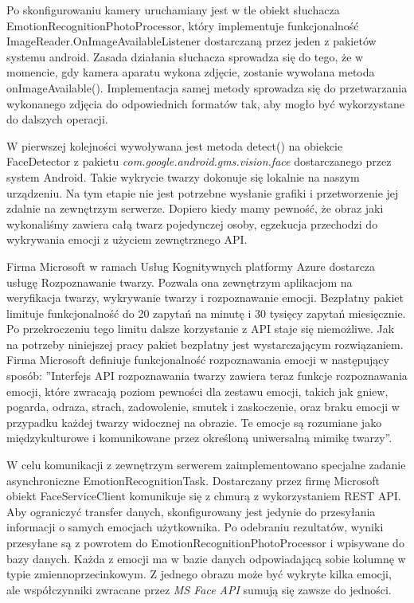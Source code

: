 Po skonfigurowaniu kamery uruchamiany jest w tle obiekt słuchacza EmotionRecognitionPhotoProcessor, który implementuje funkcjonalność ImageReader.OnImageAvailableListener dostarczaną przez jeden z pakietów systemu android. Zasada działania słuchacza sprowadza się do tego, że w momencie, gdy kamera aparatu wykona zdjęcie, zostanie wywołana metoda onImageAvailable(). Implementacja samej metody sprowadza się do przetwarzania wykonanego zdjęcia do odpowiednich formatów tak, aby mogło być wykorzystane do dalszych operacji.

W pierwszej kolejności wywoływana jest metoda detect() na obiekcie FaceDetector z pakietu \textit{com.google.android.gms.vision.face} dostarczanego przez system Android. Takie wykrycie twarzy dokonuje się lokalnie na naszym urządzeniu. Na tym etapie nie jest potrzebne wysłanie grafiki i przetworzenie jej zdalnie na zewnętrzym serwerze. Dopiero kiedy mamy pewność, że obraz jaki wykonaliśmy zawiera całą twarz pojedynczej osoby, egzekucja przechodzi do wykrywania emocji z użyciem zewnętrznego API.

Firma Microsoft w ramach Usług Kognitywnych platformy Azure dostarcza usługę Rozpoznawanie twarzy. Pozwala ona zewnętrzym aplikacjom na weryfikacja twarzy, wykrywanie twarzy i rozpoznawanie emocji. Bezpłatny pakiet limituje funkcjonalność do 20 zapytań na minutę i 30 tysięcy zapytań miesięcznie. Po przekroczeniu tego limitu dalsze korzystanie z API staje się niemożliwe. Jak na potrzeby niniejszej pracy pakiet bezpłatny jest wystarczającym rozwiązaniem. Firma Microsoft definiuje funkcjonalność rozpoznawania emocji w następujący sposób: ''Interfejs API rozpoznawania twarzy zawiera teraz funkcje rozpoznawania emocji, które zwracają poziom pewności dla zestawu emocji, takich jak gniew, pogarda, odraza, strach, zadowolenie, smutek i zaskoczenie, oraz braku emocji w przypadku każdej twarzy widocznej na obrazie. Te emocje są rozumiane jako międzykulturowe i komunikowane przez określoną uniwersalną mimikę twarzy''\cite{azure}.

W celu komunikacji z zewnętrzym serwerem zaimplementowano specjalne zadanie asynchroniczne EmotionRecognitionTask. Dostarczany przez firmę Microsoft obiekt FaceServiceClient komunikuje się z chmurą z wykorzystaniem REST API. Aby ograniczyć transfer danych, skonfigurowany jest jedynie do przesyłania informacji o samych emocjach użytkownika. Po odebraniu rezultatów, wyniki przesyłane są z powrotem do EmotionRecognitionPhotoProcessor i wpisywane do bazy danych. Każda z emocji ma w bazie danych odpowiadającą sobie kolumnę w typie zmiennoprzecinkowym. Z jednego obrazu może być wykryte kilka emocji, ale współczynniki zwracane przez \textit{MS Face API} sumują się zawsze do jedności.


